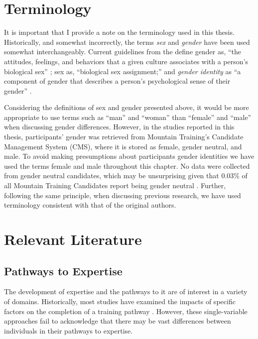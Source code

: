 \documentclass[
  12pt,
  a4paper,
]{book}
\begin{document}
\hypertarget{terminology}{%
\section{Terminology}\label{terminology}}

It is important that I provide a note on the terminology used in this thesis. Historically, and somewhat incorrectly, the terms \emph{sex} and \emph{gender} have been used somewhat interchangeably. Current guidelines from the \citet{APA2020} define gender as, ``the attitudes, feelings, and behaviors that a given culture associates with a person's biological sex'' \citep[p 12]{APA2012}; sex as, ``biological sex assignment;'' and \textit{gender identity} as ``a component of gender that describes a person's psychological sense of their gender'' \citep[Section 5.5]{APA2020}.

Considering the definitions of sex and gender presented above, it would be more appropriate to use terms such as ``man'' and ``woman'' than ``female'' and ``male'' when discussing gender differences. However, in the studies reported in this thesis, participants' gender was retrieved from Mountain Training's Candidate Management System (CMS), where it is stored as female, gender neutral, and male. To avoid making presumptions about participants gender identities we have used the terms female and male throughout this chapter. No data were collected from gender neutral candidates, which may be unsurprising given that 0.03\% of all Mountain Training Candidates report being gender neutral \citep{MountainTrainingUK2019a}. Further, following the same principle, when discussing previous research, we have used terminology consistent with that of the original authors.

\hypertarget{relevant-literature}{%
\section{Relevant Literature}\label{relevant-literature}}

\hypertarget{pathways-to-expertise}{%
\subsection{Pathways to Expertise}\label{pathways-to-expertise}}

The development of expertise and the pathways to it are of interest in a variety of domains. Historically, most studies have examined the impacts of specific factors on the completion of a training pathway \citep[e.g., delays in completing PhDs;][]{VandeSchoot2013a}. However, these single-variable approaches fail to acknowledge that there may be vast differences between individuals in their pathways to expertise.
\end{document}
